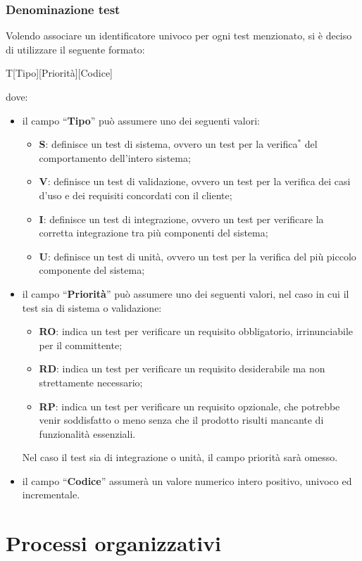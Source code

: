 \documentclass[11pt,a4paper]{article}
\begin{document}
{	\subsubsection{Denominazione test}
	Volendo associare un identificatore univoco per ogni test menzionato, si \`e deciso di utilizzare il seguente formato:
	\begin{center}
		T[Tipo][Priorità][Codice]
	\end{center}
	dove:
	\begin{itemize}
		\item il campo “\textbf{Tipo}” può assumere uno dei seguenti valori:
		\begin{itemize}
			\item \textbf{S}: definisce un test di sistema, ovvero un test per la verifica$^*$ del comportamento dell'intero sistema;
			\item \textbf{V}: definisce un test di validazione, ovvero un test per la verifica dei casi d'uso e dei requisiti concordati con il cliente;
			\item \textbf{I}: definisce un test di integrazione, ovvero un test per verificare la corretta integrazione tra più componenti del sistema;
			\item \textbf{U}: definisce un test di unità, ovvero un test per la verifica del più piccolo componente del sistema;
		\end{itemize}
		\item il campo “\textbf{Priorità}” può assumere uno dei seguenti valori, nel caso in cui il test sia di sistema o validazione:
			\begin{itemize}
				\item \textbf{RO}: indica un test per verificare un requisito obbligatorio, irrinunciabile per il committente;
				\item \textbf{RD}: indica un test per verificare un requisito desiderabile ma non strettamente necessario;
				\item \textbf{RP}: indica un test per verificare un requisito opzionale, che potrebbe venir soddisfatto o meno senza che il prodotto risulti mancante di funzionalità essenziali.
			\end{itemize}
			Nel caso il test sia di integrazione o unità, il campo priorità sarà omesso.
		\item il campo “\textbf{Codice}” assumerà un valore numerico intero positivo, univoco ed incrementale.
	\end{itemize}
	
	\section{Processi organizzativi}
	
}
\end{document}
